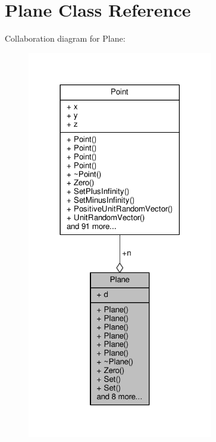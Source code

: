 \hypertarget{classPlane}{}\section{Plane Class Reference}
\label{classPlane}


Collaboration diagram for Plane\+:
\nopagebreak
\begin{figure}[H]
\begin{center}
\leavevmode
\includegraphics[width=230pt]{df/dbb/classPlane__coll__graph}
\end{center}
\end{figure}
